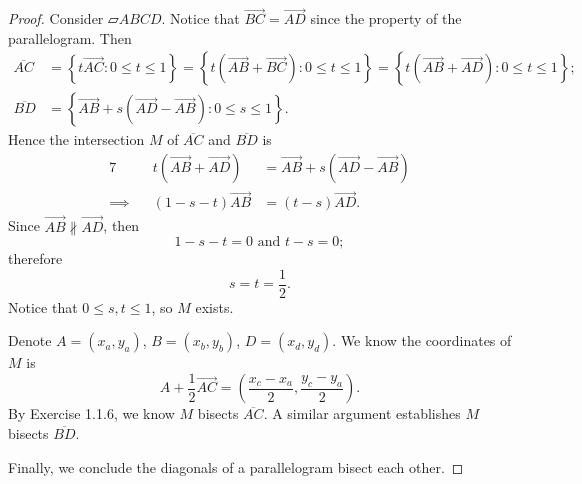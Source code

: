 \begin{Exercise}
	\begin{proof}
		Consider $\parallelogram A B C D$. Notice that $\overrightarrow{B C} = \overrightarrow{A D}$ since the property of the parallelogram. Then
		\begin{align*}
			\overline{A C} 
			&= \left\{ t\overrightarrow{A C}: 0\leq t\leq 1 \right\} 
			= \left\{ t\left( \overrightarrow{A B} + \overrightarrow{B C} \right): 0\leq t\leq 1 \right\}
			= \left\{ t\left( \overrightarrow{A B} + \overrightarrow{A D} \right): 0\leq t\leq 1 \right\}; \\
			\overline{B D} 
			&= \left\{ \overrightarrow{A B} + s\left( \overrightarrow{A D} - \overrightarrow{AB} \right): 0\leq s\leq 1 \right\}.
		\end{align*}
		Hence the intersection $M$ of $\overline{A C}$ and $\overline{B D}$ is
		\begin{alignat*}{7}
			\quad&& t\left( \overrightarrow{A B} + \overrightarrow{A D} \right)
			&= \overrightarrow{A B} + s\left( \overrightarrow{A D} - \overrightarrow{AB} \right) \\
			\implies&& (1-s-t)\overrightarrow{A B} &= (t-s)\overrightarrow{A D}.
		\end{alignat*}
		Since $\overrightarrow{A B}\nparallel \overrightarrow{A D}$, then
		$$
		1-s-t = 0 \text{ and } t-s=0;
		$$
		therefore 
		$$
		s=t=\frac{1}{2}.
		$$
		Notice that $0\leq s,t \leq 1$, so $M$ exists.
		
		Denote $A = (x_a, y_a)$, $B = (x_b, y_b)$, $D = (x_d, y_d)$.
		We know the coordinates of $M$ is 
		$$
		A+\frac{1}{2}\overrightarrow{A C}
		= \left( \frac{x_c-x_a}{2}, \frac{y_c-y_a}{2} \right).
		$$
		By Exercise 1.1.6, we know $M$ bisects $\overline{A C}$. A similar argument establishes $M$ bisects $\overline{B D}$.
		
		Finally, we conclude the diagonals of a parallelogram bisect each other.
	\end{proof}
\end{Exercise}